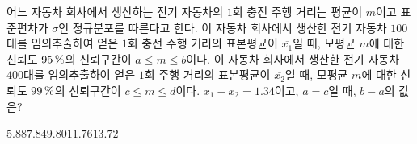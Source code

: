 어느 자동차 회사에서 생산하는 전기 자동차의 $1$회 충전 주행 거리는 평균이 $m$이고 표준편차가 $\sigma$인 정규분포를 따른다고 한다. 이 자동차 회사에서 생산한 전기 자동차 $100$대를 임의추출하여 얻은 $1$회 충전 주행 거리의 표본평균이 $\overline{x_1}$일 때, 모평균 $m$에 대한 신뢰도 $95\mkern3mu \%$의 신뢰구간이 $a\le m\le b$이다. 이 자동차 회사에서 생산한 전기 자동차 $400$대를 임의추출하여 얻은 $1$회 주행 거리의 표본평균이 $\overline{x_2}$일 때, 모평균 $m$에 대한 신뢰도 $99\mkern3mu \%$의 신뢰구간이 $c\le m\le d$이다. $\overline{x_1}-\overline{x_2}=1.34$이고, $a=c$일 때, $b-a$의 값은? 
\begin{choices32}{$5.88$}{$7.84$}{$9.80$}{$11.76$}{$13.72$}\end{choices32}
